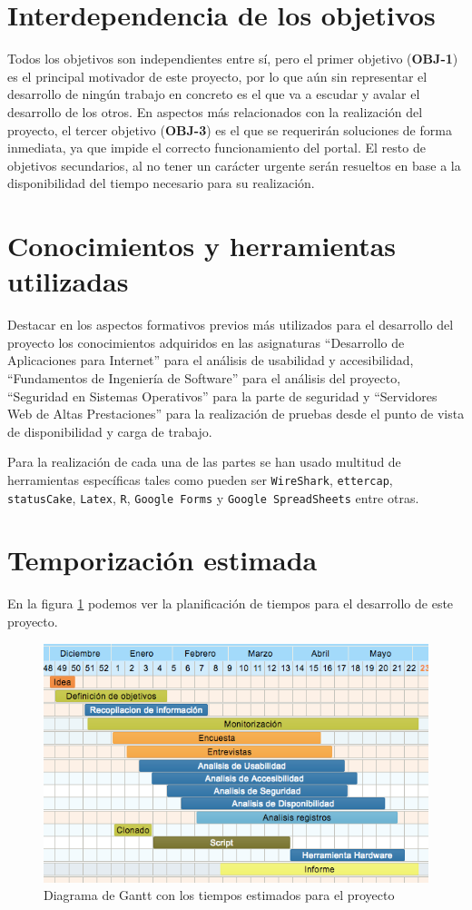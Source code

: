 \section{Interdependencia de los objetivos}

Todos los objetivos son independientes entre sí, pero el primer objetivo (\textbf{OBJ-1}) es el principal motivador de este proyecto, por lo que aún sin representar el desarrollo de ningún trabajo en concreto es el que va a escudar y avalar el desarrollo de los otros. En aspectos más relacionados con la realización del proyecto, el tercer objetivo (\textbf{OBJ-3}) es el que se requerirán soluciones de forma inmediata, ya que impide el correcto funcionamiento del portal. El resto de objetivos secundarios, al no tener un carácter urgente serán resueltos en base a la disponibilidad del tiempo necesario para su realización.

\section{Conocimientos y herramientas utilizadas}

\bigskip
Destacar en los aspectos formativos previos más utilizados para el desarrollo del proyecto los conocimientos adquiridos en las asignaturas ``Desarrollo de Aplicaciones para Internet'' para el análisis de usabilidad y accesibilidad, ``Fundamentos de Ingeniería de Software'' para el análisis del proyecto, ``Seguridad en Sistemas Operativos'' para la parte de seguridad y ``Servidores Web de Altas Prestaciones'' para la realización de pruebas desde el punto de vista de disponibilidad y carga de trabajo.

Para la realización de cada una de las partes se han usado multitud de herramientas específicas tales como pueden ser \texttt{WireShark}, \texttt{ettercap}, \texttt{statusCake}, \texttt{Latex}, \texttt{R}, \texttt{Google Forms} y \texttt{Google SpreadSheets} entre otras.


\section{Temporización estimada}


En la figura \ref{fig:temporizacion1} podemos ver la planificación de tiempos para el desarrollo de este proyecto.

\begin{figure}[H]
\centering
\includegraphics[width=1.3\textwidth,angle=90]{../screenshots/temporizacion1}
\caption{Diagrama de Gantt con los tiempos estimados para el proyecto}
\label{fig:temporizacion1}
\end{figure}







